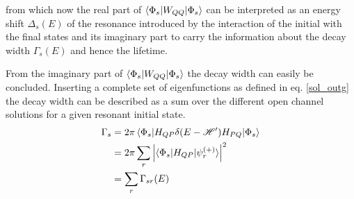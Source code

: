 from which now the real part of $\braket{\Phi_s|W_{QQ}|\Phi_s}$ can be interpreted 
as an energy shift $\Delta_s(E)$ of the resonance introduced by the interaction of the initial
with the final states and its imaginary part to carry the information about the
decay width $\Gamma_s(E)$ and hence the lifetime.






From the imaginary part of $\braket{\Phi_s|W_{QQ}|\Phi_s}$ the decay width can
easily be concluded. Inserting a complete set
of eigenfunctions as defined in eq. \ref{sol_outg} the decay width can be described
as a sum over the different open channel solutions for a given resonant initial state.
\begin{align}
  \Gamma_s & = 2 \pi \braket{\Phi_s|H_{QP}\delta(E-\mathscr{H}')H_{PQ}|\Phi_s}\\
           & = 2 \pi \sum\limits_r \left | \braket{\Phi_s|H_{QP}|\psi_r^{(+)}} \right|^2\\
           & = \sum\limits_r \Gamma_{sr}(E)
\end{align}
